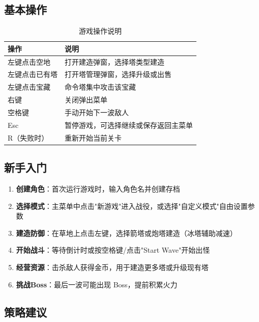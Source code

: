 \documentclass[12pt,a4paper]{ctexart}
\begin{document}
\subsection{基本操作}

\begin{table}[H]
    \centering
    \caption{游戏操作说明}
    \begin{tabularx}{\textwidth}{lX}
        \toprule
        \textbf{操作} & \textbf{说明} \\
        \midrule
        左键点击空地 & 打开建造弹窗，选择塔类型建造 \\
        左键点击已有塔 & 打开塔管理弹窗，选择升级或出售 \\
        左键点击宝藏 & 命令塔集中攻击该宝藏 \\
        右键 & 关闭弹出菜单 \\
        空格键 & 手动开始下一波敌人 \\
        Esc & 暂停游戏，可选择继续或保存返回主菜单 \\
        R（失败时） & 重新开始当前关卡 \\
        \bottomrule
    \end{tabularx}
\end{table}

\subsection{新手入门}

\begin{enumerate}
    \item \textbf{创建角色}：首次运行游戏时，输入角色名并创建存档
    \item \textbf{选择模式}：主菜单中点击"新游戏"进入战役，或选择"自定义模式"自由设置参数
    \item \textbf{建造防御}：在草地上点击左键，选择箭塔或炮塔建造（冰塔辅助减速）
    \item \textbf{开始战斗}：等待倒计时或按空格键/点击"Start Wave"开始出怪
    \item \textbf{经营资源}：击杀敌人获得金币，用于建造更多塔或升级现有塔
    \item \textbf{挑战Boss}：最后一波可能出现 Boss，提前积累火力
\end{enumerate}

\subsection{策略建议}
\end{document}
